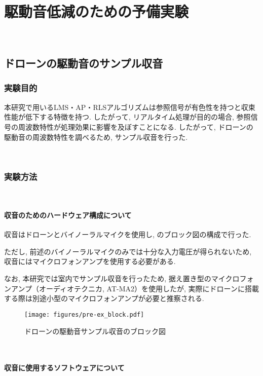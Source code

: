 \chapter{駆動音低減のための予備実験}\label{noise-pre-experiment}

\
\section{ドローンの駆動音のサンプル収音}\label{record-drone}

\subsection{実験目的}\label{purpose-drone}

本研究で用いるLMS・AP・RLSアルゴリズムは参照信号が有色性を持つと収束性能が低下する特徴を持つ. したがって, リアルタイム処理が目的の場合, 参照信号の周波数特性が処理効果に影響を及ぼすことになる. したがって, ドローンの駆動音の周波数特性を調べるため, サンプル収音を行った. 

\
\subsection{実験方法}\label{instruction-drone}

\
\subsubsection{収音のためのハードウェア構成について}\label{hardware-for-record}

収音はドローンとバイノーラルマイクを使用し, のブロック図の構成で行った. 

ただし, 前述のバイノーラルマイクのみでは十分な入力電圧が得られないため, 収音にはマイクロフォンアンプを使用する必要がある. 

なお, 本研究では室内でサンプル収音を行ったため, 据え置き型のマイクロフォンアンプ（オーディオテクニカ, AT-MA2）を使用したが, 実際にドローンに搭載する際は別途小型のマイクロフォンアンプが必要と推察される. 
\begin{figure}[H]
\centering
\texttt{[image: figures/pre-ex\_block.pdf]}
\caption{ドローンの駆動音サンプル収音のブロック図}
\label{fig:pre-ex_block}
\end{figure}

\
\subsubsection{収音に使用するソフトウェアについて}\label{software-for-record}

